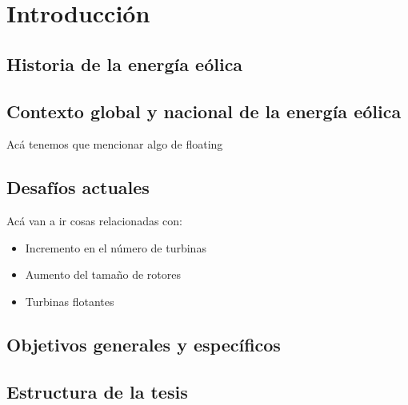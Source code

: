 \chapter{Introducción}


\section{Historia de la energía eólica}

\section{Contexto global y nacional de la energía eólica}

Acá tenemos que mencionar algo de floating

\section{Desafíos actuales}

Acá van a ir cosas relacionadas con:

\begin{itemize}
	\item Incremento en el número de turbinas
	\item Aumento del tamaño de rotores
	\item Turbinas flotantes	
\end{itemize}

\section{Objetivos generales y específicos} 

\section{Estructura de la tesis}
